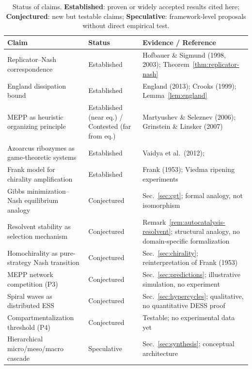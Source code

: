 \documentclass[12pt,a4paper]{article}
\theoremstyle{remark}
\begin{document}
\begin{table}[htbp]
\centering
\caption{Status of claims. \textbf{Established}: proven or widely accepted results cited here; \textbf{Conjectured}: new but testable claims; \textbf{Speculative}: framework-level proposals without direct empirical test.}
\label{tab:status-claims}
\small
\begin{tabular}{p{4.8cm}lp{5.2cm}}
\toprule
\textbf{Claim} & \textbf{Status} & \textbf{Evidence / Reference} \\
\midrule
Replicator--Nash correspondence & Established & Hofbauer \& Sigmund (1998, 2003); Theorem~\ref{thm:replicator-nash} \\
England dissipation bound & Established & England (2013); Crooks (1999); Lemma~\ref{lem:england} \\
MEPP as heuristic organizing principle & Established (near eq.) / Contested (far from eq.) & Martyushev \& Seleznev (2006); Grinstein \& Linsker (2007) \\
Azoarcus ribozymes as game-theoretic systems & Established & Vaidya et al.\ (2012); \citet{SieversKiedrowski1994} \\
Frank model for chirality amplification & Established & Frank (1953); Viedma ripening experiments \\
Gibbs minimization--Nash equilibrium analogy & Conjectured & Sec.~\ref{sec:cgt}; formal analogy, not isomorphism \\
Resolvent stability as selection mechanism & Conjectured & Remark~\ref{rem:autocatalysis-resolvent}; structural analogy, no domain-specific formalization \\
Homochirality as pure-strategy Nash transition & Conjectured & Sec.~\ref{sec:chirality}; reinterpretation of Frank (1953) \\
MEPP network competition (P3) & Conjectured & Sec.~\ref{sec:predictions}; illustrative simulation, no experiment \\
Spiral waves as distributed ESS & Conjectured & Sec.~\ref{sec:hypercycles}; qualitative, no quantitative DESS proof \\
Compartmentalization threshold (P4) & Conjectured & Testable; no experimental data yet \\
Hierarchical micro/meso/macro cascade & Speculative & Sec.~\ref{sec:synthesis}; conceptual architecture \\
\bottomrule
\end{tabular}
\end{table}

\end{document}
